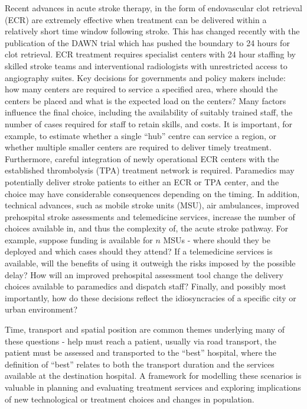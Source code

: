 \documentclass[utf8]{frontiersHLTH}
\begin{document}
Recent advances in acute stroke therapy, in the form of endovascular
clot retrieval
(ECR)\cite{berkhemer2015randomized,goyal2016endovascular,goyal2015randomized,campbell2015endovascular,saver2015stent}
are extremely effective when treatment can be delivered within a
relatively short time window following stroke. This has changed recently with the publication of the DAWN trial which has pushed the boundary to 24 hours for clot retrieval. ECR treatment requires
specialist centers with 24 hour staffing by skilled stroke teams and
interventional radiologists with unrestricted access to angiography
suites. Key decisions for governments and policy makers include: how
many centers are required to service a specified area, where should
the centers be placed and what is the expected load on the centers?
Many factors influence the final choice, including the availability of
suitably trained staff, the number of cases required for staff to
retain skills, and costs. It is important, for example, to estimate
whether a single ``hub'' centre can service a region, or whether
multiple smaller centers are required to deliver timely
treatment. Furthermore, careful integration of newly operational ECR
centers with the established thrombolysis
(TPA)\cite{tnionda1995tissue} treatment network is
required. Paramedics may potentially deliver stroke patients to either
an ECR or TPA center, and the choice may have considerable
consequences depending on the timing. In addition, technical advances,
such as mobile stroke units (MSU), air ambulances, improved
prehospital stroke assessments and telemedicine services, increase the
number of choices available in, and thus the complexity of, the acute
stroke pathway. For example, suppose funding is available for $n$ MSUs
- where should they be deployed and which cases should they attend? If
a telemedicine services is available, will the benefits of using it
outweigh the risks imposed by the possible delay?  How will an
improved prehospital assessment tool change the delivery choices
available to paramedics and dispatch staff? Finally, and possibly most
importantly, how do these decisions reflect the idiosyncracies of a
specific city or urban environment?

Time, transport and spatial position are common themes underlying many
of these questions - help must reach a patient, usually via road
transport, the patient must be assessed and transported to the
``best'' hospital, where the definition of ``best'' relates to both
the transport duration and the services available at the destination
hospital. A framework for modelling these scenarios is valuable in
planning and evaluating treatment services and exploring implications
of new technological or treatment choices and changes in population.
\end{document}
